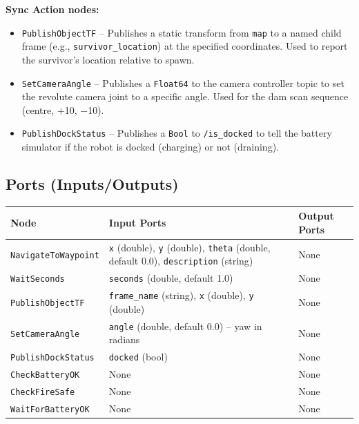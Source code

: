 \documentclass[12pt, a4paper]{article}
\begin{document}
\textbf{Sync Action nodes:}
\begin{itemize}
    \item \texttt{PublishObjectTF} -- Publishes a static transform from \texttt{map} to a named child frame (e.g., \texttt{survivor\_location}) at the specified coordinates. Used to report the survivor's location relative to spawn.
    \item \texttt{SetCameraAngle} -- Publishes a \texttt{Float64} to the camera controller topic to set the revolute camera joint to a specific angle. Used for the dam scan sequence (centre, $+$10\textdegree, $-$10\textdegree).
    \item \texttt{PublishDockStatus} -- Publishes a \texttt{Bool} to \texttt{/is\_docked} to tell the battery simulator if the robot is docked (charging) or not (draining).
\end{itemize}

\subsection{Ports (Inputs/Outputs)}

\begin{longtable}{L{3.8cm} L{7cm} L{3cm}}
    \toprule
    \textbf{Node} & \textbf{Input Ports} & \textbf{Output Ports} \\
    \midrule
    \endhead

    \texttt{NavigateToWaypoint} & \texttt{x} (double), \texttt{y} (double), \texttt{theta} (double, default 0.0), \texttt{description} (string) & None \\
    \addlinespace
    \texttt{WaitSeconds} & \texttt{seconds} (double, default 1.0) & None \\
    \addlinespace
    \texttt{PublishObjectTF} & \texttt{frame\_name} (string), \texttt{x} (double), \texttt{y} (double) & None \\
    \addlinespace
    \texttt{SetCameraAngle} & \texttt{angle} (double, default 0.0) -- yaw in radians & None \\
    \addlinespace
    \texttt{PublishDockStatus} & \texttt{docked} (bool) & None \\
    \addlinespace
    \texttt{CheckBatteryOK} & None & None \\
    \addlinespace
    \texttt{CheckFireSafe} & None & None \\
    \addlinespace
    \texttt{WaitForBatteryOK} & None & None \\
    \bottomrule
\end{longtable}
\end{document}
